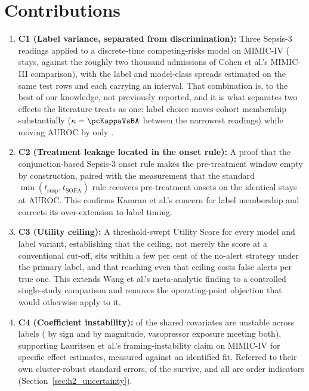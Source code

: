 \section{Contributions}

\begin{enumerate}
    \item \textbf{C1 (Label variance, separated from discrimination):} Three
    Sepsis-3 readings applied to a discrete-time competing-risks model on
    MIMIC-IV (\pcNStays{} stays, against the roughly two thousand admissions of
    Cohen et al.'s MIMIC-III comparison), with the label and model-class
    spreads estimated on the same test rows and each carrying an interval. That
    combination is, to the best of our knowledge, not previously reported, and
    it is what separates two effects the literature treats as one: label choice
    moves cohort membership substantially ($\kappa = \pcKappaVsBA$ between the
    narrowest readings) while moving AUROC by only \pcSpreadLabel.

    \item \textbf{C2 (Treatment leakage located in the onset rule):} A proof that
    the conjunction-based Sepsis-3 onset rule makes the pre-treatment window
    empty by construction, paired with the measurement that the standard
    $\min(t_{\text{susp}}, t_{\text{SOFA}})$ rule recovers
    \pcPreTreatOnsetsVarF{} pre-treatment onsets on the identical stays at
    \pcPreTreatAurocPrimaryF{} AUROC. This confirms Kamran et al.'s
    \cite{kamran2024evaluation} concern for label membership and corrects its
    over-extension to label timing.

    \item \textbf{C3 (Utility ceiling):} A threshold-swept Utility Score for
    every model and label variant, establishing that the ceiling, not merely
    the score at a conventional cut-off, sits within a few per cent of the
    no-alert strategy under the primary label, and that reaching even that
    ceiling costs
    \pcUtilityOptBurdenGbtB{} false alerts per true one. This extends Wang et
    al.'s \cite{wang2025srpm} meta-analytic finding to a controlled
    single-study comparison and removes the operating-point objection that
    would otherwise apply to it.

    \item \textbf{C4 (Coefficient instability):} \pcHTwoEst{} of the
    \pcHTwoNTerms{} shared covariates are unstable across labels
    (\pcHTwoNSign{} by sign and \pcHTwoNMag{} by magnitude, vasopressor
    exposure meeting both), supporting Lauritsen et al.'s
    \cite{lauritsen2021framing} framing-instability claim on MIMIC-IV for
    specific effect estimates, measured against an identified fit. Referred to
    their own cluster-robust standard errors, \pcHTwoNRobust{} of the
    \pcHTwoNFlagged{} survive, and all \pcHTwoNRobust{} are order indicators
    (Section~\ref{sec:h2_uncertainty}).


\end{enumerate}
